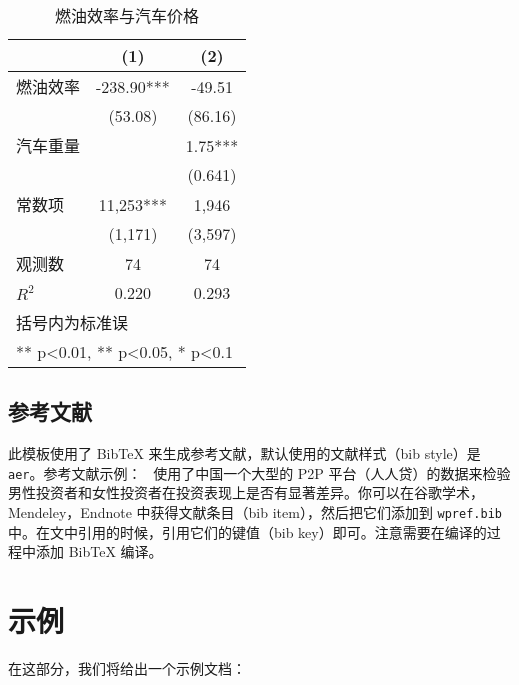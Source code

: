 \documentclass[lang=cn]{elegantpaper}
\begin{document}
\begin{table}[htbp]
  \small
  \centering
  \caption{燃油效率与汽车价格}
    \begin{tabular}{lcc}
    \toprule
                    &       (1)         &        (2)      \\
    \midrule
    燃油效率        &    -238.90***     &      -49.51     \\
                    &     (53.08)       &      (86.16)    \\
    汽车重量        &                   &        1.75***  \\
                    &                   &       (0.641)   \\
    常数项          &  11,253***        &    1,946       \\
                    &  (1,171)          &   (3,597)      \\
    观测数          &      74           &       74        \\
    $R^2$           &       0.220       &        0.293    \\
    \bottomrule
    \multicolumn{3}{l}{\scriptsize 括号内为标准误} \\
    \multicolumn{3}{l}{\scriptsize *** p<0.01, ** p<0.05, * p<0.1} \\
    \end{tabular}%
  \label{tab:reg}%
\end{table}%


\subsection{参考文献}
此模板使用了 Bib\TeX{} 来生成参考文献，默认使用的文献样式（bib style）是 \lstinline{aer}。参考文献示例：~\cite{Chen2018} 使用了中国一个大型的 P2P 平台（人人贷）的数据来检验男性投资者和女性投资者在投资表现上是否有显著差异。你可以在谷歌学术，Mendeley，Endnote 中获得文献条目（bib item），然后把它们添加到 \lstinline{wpref.bib} 中。在文中引用的时候，引用它们的键值（bib key）即可。注意需要在编译的过程中添加 Bib\TeX{} 编译。


\section{示例}
在这部分，我们将给出一个示例文档：
\end{document}
